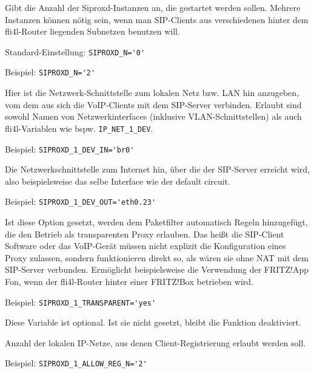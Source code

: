 \begin{description}


Gibt die Anzahl der Siproxd-Instanzen an, die gestartet werden sollen.
Mehrere Instanzen können nötig sein, wenn man SIP-Clients aus
verschiedenen hinter dem fli4l-Router liegenden Subnetzen benutzen will.

Standard-Einstellung: \verb+SIPROXD_N='0'+

Beispiel: \verb+SIPROXD_N='2'+


Hier ist die Netzwerk-Schnittstelle zum lokalen Netz bzw. LAN hin
anzugeben, vom dem aus sich die VoIP-Clients mit dem SIP-Server
verbinden.  Erlaubt sind sowohl Namen von Netzwerkinterfaces (inklusive
VLAN-Schnittstellen) als auch fli4l-Variablen wie bspw.
\verb+IP_NET_1_DEV+.

Beispiel: \verb+SIPROXD_1_DEV_IN='br0'+


Die Netzwerkschnittstelle zum Internet hin, über die der SIP-Server
erreicht wird, also beispielsweise das selbe Interface wie der default
circuit.

Beispiel: \verb+SIPROXD_1_DEV_OUT='eth0.23'+


Ist diese Option gesetzt, werden dem Paketfilter automatisch Regeln
hinzugefügt, die den Betrieb als transparenten Proxy erlauben.  Das
heißt die SIP-Client Software oder das VoIP-Gerät müssen nicht explizit
die Konfiguration eines Proxy zulassen, sondern funktionieren direkt so,
als wären sie ohne NAT mit dem SIP-Server verbunden.  Ermöglicht
beispielsweise die Verwendung der FRITZ!App Fon, wenn der fli4l-Router
hinter einer FRITZ!Box betrieben wird.

Beispiel: \verb+SIPROXD_1_TRANSPARENT='yes'+

Diese Variable ist optional. Ist sie nicht gesetzt, bleibt die Funktion
deaktiviert.


Anzahl der lokalen IP-Netze, aus denen Client-Registrierung erlaubt
werden soll.

Beispiel: \verb+SIPROXD_1_ALLOW_REG_N='2'+


\end{description}
